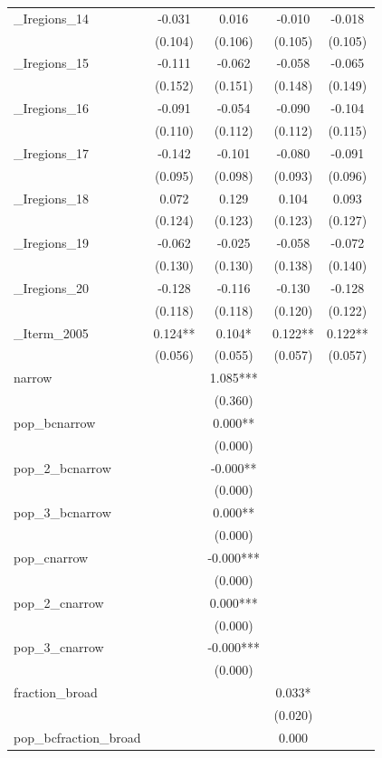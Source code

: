\documentclass[]{article}
\begin{document}
\begin{tabular}{lcccc}
\_Iregions\_14 & -0.031 & 0.016 & -0.010 & -0.018 \\
 & (0.104) & (0.106) & (0.105) & (0.105) \\
\_Iregions\_15 & -0.111 & -0.062 & -0.058 & -0.065 \\
 & (0.152) & (0.151) & (0.148) & (0.149) \\
\_Iregions\_16 & -0.091 & -0.054 & -0.090 & -0.104 \\
 & (0.110) & (0.112) & (0.112) & (0.115) \\
\_Iregions\_17 & -0.142 & -0.101 & -0.080 & -0.091 \\
 & (0.095) & (0.098) & (0.093) & (0.096) \\
\_Iregions\_18 & 0.072 & 0.129 & 0.104 & 0.093 \\
 & (0.124) & (0.123) & (0.123) & (0.127) \\
\_Iregions\_19 & -0.062 & -0.025 & -0.058 & -0.072 \\
 & (0.130) & (0.130) & (0.138) & (0.140) \\
\_Iregions\_20 & -0.128 & -0.116 & -0.130 & -0.128 \\
 & (0.118) & (0.118) & (0.120) & (0.122) \\
\_Iterm\_2005 & 0.124** & 0.104* & 0.122** & 0.122** \\
 & (0.056) & (0.055) & (0.057) & (0.057) \\
narrow &  & 1.085*** &  &  \\
 &  & (0.360) &  &  \\
pop\_bcnarrow &  & 0.000** &  &  \\
 &  & (0.000) &  &  \\
pop\_2\_bcnarrow &  & -0.000** &  &  \\
 &  & (0.000) &  &  \\
pop\_3\_bcnarrow &  & 0.000** &  &  \\
 &  & (0.000) &  &  \\
pop\_cnarrow &  & -0.000*** &  &  \\
 &  & (0.000) &  &  \\
pop\_2\_cnarrow &  & 0.000*** &  &  \\
 &  & (0.000) &  &  \\
pop\_3\_cnarrow &  & -0.000*** &  &  \\
 &  & (0.000) &  &  \\
fraction\_broad &  &  & 0.033* &  \\
 &  &  & (0.020) &  \\
pop\_bcfraction\_broad &  &  & 0.000 &  \\

\end{tabular}
\end{document}
